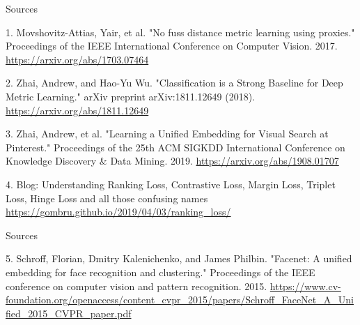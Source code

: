 \documentclass{beamer}
\begin{document}
\begin{frame}{Sources}

\begin{thebibliography}{0}

   1. Movshovitz-Attias, Yair, et al. "No fuss distance metric learning using proxies." Proceedings of the IEEE International Conference on Computer Vision. 2017. \url{https://arxiv.org/abs/1703.07464} 
  
   2. Zhai, Andrew, and Hao-Yu Wu. "Classification is a Strong Baseline for Deep Metric Learning." arXiv preprint arXiv:1811.12649 (2018). \url{https://arxiv.org/abs/1811.12649}
  
   3. Zhai, Andrew, et al. "Learning a Unified Embedding for Visual Search at Pinterest." Proceedings of the 25th ACM SIGKDD International Conference on Knowledge Discovery \& Data Mining. 2019. \url{https://arxiv.org/abs/1908.01707}
  
   4. Blog: Understanding Ranking Loss, Contrastive Loss, Margin Loss, Triplet Loss, Hinge Loss and all those confusing names \url{https://gombru.github.io/2019/04/03/ranking_loss/}
  
\end{thebibliography}

\end{frame}

\begin{frame}{Sources}

\begin{thebibliography}{0}

   5. Schroff, Florian, Dmitry Kalenichenko, and James Philbin. "Facenet: A unified embedding for face recognition and clustering." Proceedings of the IEEE conference on computer vision and pattern recognition. 2015. \url{https://www.cv-foundation.org/openaccess/content_cvpr_2015/papers/Schroff_FaceNet_A_Unified_2015_CVPR_paper.pdf} 

  
\end{thebibliography}

\end{frame}
 
\end{document}

